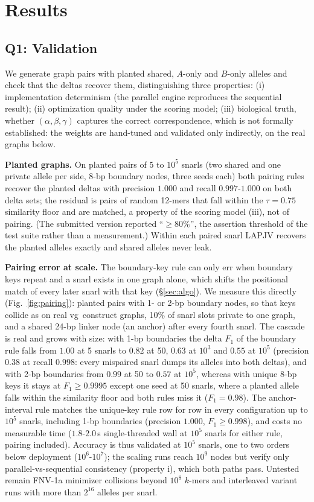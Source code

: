 \section{Results}
\label{sec:eval}

\subsection{Q1: Validation}
We generate graph pairs with planted shared, $A$-only and $B$-only alleles and check that the deltas recover them, distinguishing three properties: (i) implementation determinism (the parallel engine reproduces the sequential result); (ii) optimization quality under the scoring model; (iii) biological truth, whether $(\alpha,\beta,\gamma)$ captures the correct correspondence, which is not formally established: the weights are hand-tuned and validated only indirectly, on the real graphs below.

\textbf{Planted graphs.} On planted pairs of $5$ to $10^5$ snarls (two shared and one private allele per side, 8-bp boundary nodes, three seeds each) both pairing rules recover the planted deltas with precision $1.000$ and recall $0.997$-$1.000$ on both delta sets; the residual is pairs of random 12-mers that fall within the $\tau=0.75$ similarity floor and are matched, a property of the scoring model (iii), not of pairing. (The submitted version reported ``$\ge 80\%$'', the assertion threshold of the test suite rather than a measurement.) Within each paired snarl LAPJV recovers the planted alleles exactly and shared alleles never leak.

\textbf{Pairing error at scale.} The boundary-key rule can only err when boundary keys repeat and a snarl exists in one graph alone, which shifts the positional match of every later snarl with that key (\S\ref{sec:algo}). We measure this directly (Fig.~\ref{fig:pairing}): planted pairs with 1- or 2-bp boundary nodes, so that keys collide as on real vg~construct graphs, 10\% of snarl slots private to one graph, and a shared 24-bp linker node (an anchor) after every fourth snarl. The cascade is real and grows with size: with 1-bp boundaries the delta $F_1$ of the boundary rule falls from $1.00$ at 5 snarls to $0.82$ at 50, $0.63$ at $10^3$ and $0.55$ at $10^5$ (precision $0.38$ at recall $0.998$: every mispaired snarl dumps its alleles into both deltas), and with 2-bp boundaries from $0.99$ at 50 to $0.57$ at $10^5$, whereas with unique 8-bp keys it stays at $F_1\ge0.9995$ except one seed at 50 snarls, where a planted allele falls within the similarity floor and both rules miss it ($F_1=0.98$). The anchor-interval rule matches the unique-key rule row for row in every configuration up to $10^5$ snarls, including 1-bp boundaries (precision $1.000$, $F_1\ge0.998$), and costs no measurable time ($1.8$-$2.0$\,s single-threaded wall at $10^5$ snarls for either rule, pairing included). Accuracy is thus validated at $10^5$ snarls, one to two orders below deployment ($10^6$-$10^7$); the scaling runs reach $10^9$ nodes but verify only parallel-vs-sequential consistency (property i), which both paths pass. Untested remain FNV-1a minimizer collisions beyond $10^8$ $k$-mers and interleaved variant runs with more than $2^{16}$ alleles per snarl.

